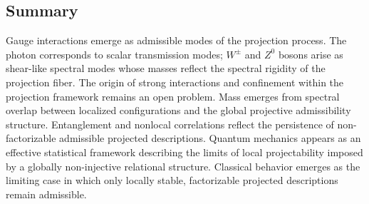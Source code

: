 \subsection{Summary}
  \label{subsec:summary-quantum}

  Gauge interactions emerge as admissible modes of the projection process.
  The photon corresponds to scalar transmission modes; $W^\pm$ and $Z^0$
  bosons arise as shear-like spectral modes whose masses reflect the
  spectral rigidity of the projection fiber.
  The origin of strong interactions and confinement within the projection
  framework remains an open problem.
  Mass emerges from spectral overlap between localized configurations and
  the global projective admissibility structure.
  Entanglement and nonlocal correlations reflect the persistence of
  non-factorizable admissible projected descriptions.
  Quantum mechanics appears as an effective statistical framework
  describing the limits of local projectability imposed by a globally
  non-injective relational structure.
  Classical behavior emerges as the limiting case in which only locally
  stable, factorizable projected descriptions remain admissible.
